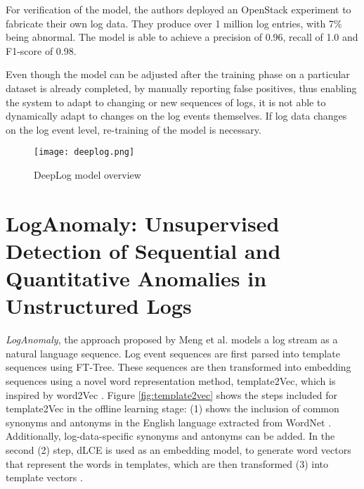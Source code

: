 For verification of the model, the authors deployed an OpenStack experiment to fabricate their own log data. They produce over 1 million log entries, with 7\% being abnormal. The model is able to achieve a precision of 0.96, recall of 1.0 and F1-score of 0.98.

Even though the model can be adjusted after the training phase on a particular dataset is already completed, by manually reporting false positives, thus enabling the system to adapt to changing or new sequences of logs, it is not able to dynamically adapt to changes on the log events themselves. If log data changes on the log event level, re-training of the model is necessary.

\begin{figure}[h]
  \centering
  \texttt{[image: deeplog.png]}\\
  \caption{DeepLog model overview \cite{graves2013speech}}
  \label{fig:deeplog}
\end{figure}


\section{LogAnomaly: Unsupervised Detection of Sequential and Quantitative Anomalies in Unstructured Logs \label{sec:loganomaly}}
\textit{LogAnomaly}, the approach proposed by Meng et al. \cite{meng2019loganomaly} models a log stream as a natural language sequence. Log event sequences are first parsed into template sequences using FT-Tree. These sequences are then transformed into embedding sequences using a novel word representation method, template2Vec, which is inspired by word2Vec \cite{mikolov2013distributed}. Figure \ref{fig:template2vec} shows the steps included for template2Vec in the offline learning stage: (1) shows the inclusion of common synonyms and antonyms in the English language extracted from WordNet \cite{miller1995wordnet}. Additionally, log-data-specific synonyms and antonyms can be added. In the second (2) step, dLCE \cite{nguyen2016integrating} is used as an embedding model, to generate word vectors that represent the words in templates, which are then transformed (3) into template vectors \cite{meng2019loganomaly}.

